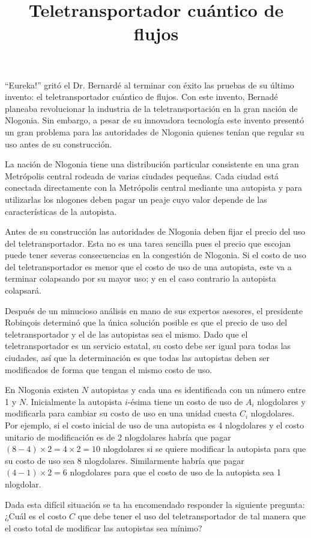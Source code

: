 \documentclass{oci}
\title{Teletransportador cuántico de flujos}
\begin{document}
\begin{problemDescription}
  ``Eureka!'' gritó el Dr. Bernardé al terminar con éxito las pruebas de su
  último invento: el teletransportador cuántico de flujos.
  Con este invento, Bernadé planeaba revolucionar la industria de la
  teletransportación en la gran nación de Nlogonia.
  Sin embargo, a pesar de su innovadora tecnología este invento presentó un gran
  problema para las autoridades de Nlogonia quienes tenían que regular su uso
  antes de su construcción.

  La nación de Nlogonia tiene una distribución particular consistente en una gran
  Metrópolis central rodeada de varias ciudades pequeñas.
  Cada ciudad está conectada directamente con la Metrópolis central mediante
  una autopista y para utilizarlas los nlogones deben pagar un peaje cuyo valor
  depende de las características de la autopista.

  Antes de su construcción las autoridades de Nlogonia deben fijar el precio del
  uso del teletransportador. 
  Esta no es una tarea sencilla pues el precio que escojan puede tener severas
  consecuencias en la congestión de Nlogonia.
  Si el costo de uso del teletransportador es menor que el costo de uso de una
  autopista, este va a terminar colapsando por su mayor uso; y en el caso
  contrario la autopista colapsará.

  Después de un minucioso análisis en mano de sus expertos asesores, el
  presidente Robinçois determinó que la única solución posible es que el precio
  de uso del teletransportador y el de las autopistas sea el mismo.
  Dado que el teletransportador es un servicio estatal, su costo debe ser
  igual para todas las ciudades, así que la determinación es que todas las
  autopistas deben ser modificados de forma que tengan el mismo costo de uso.

  En Nlogonia existen $N$ autopistas y cada una es identificada con un número
  entre 1 y $N$.
  Inicialmente la autopista $i$-ésima tiene un costo de uso de $A_i$ nlogdolares
  y modificarla para cambiar su costo de uso en una unidad cuesta $C_i$
  nlogdolares.
  Por ejemplo, si el costo inicial de uso de una autopista es 4 nlogdolares y
  el costo unitario de modificación es de 2 nlogdolares habría que pagar
  $(8-4)\times 2=4\times 2=10$ nlogdolares si se quiere modificar la autopista
  para que su costo de uso sea 8 nlogdolares.
  Similarmente habría que pagar $(4-1)\times 2=6$ nlogdolares para que el costo
  de uso de la autopista sea 1 nlogdolar.

  Dada esta difícil situación se ta ha encomendado responder la siguiente
  pregunta: ¿Cuál es el costo $C$ que debe tener el uso del teletransportador de
  tal manera que el costo total de modificar las autopistas sea mínimo?

\end{problemDescription}
\end{document}
